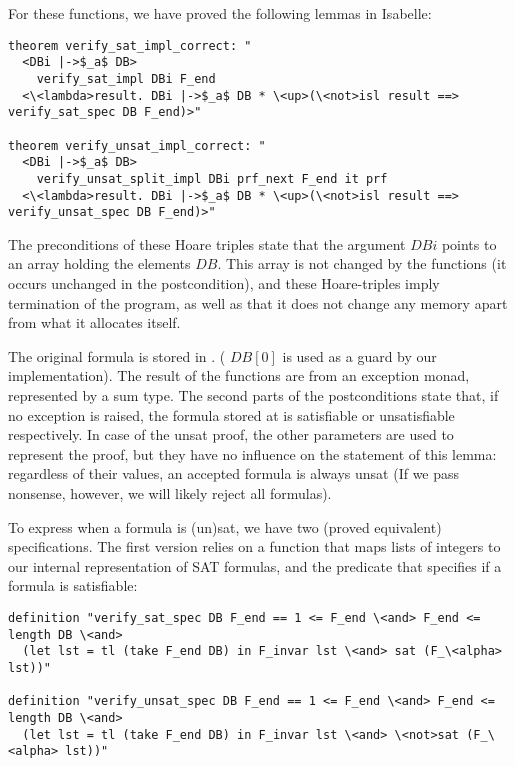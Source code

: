 \documentclass{llncs}     %
\makeatletter
\newcommand{\isai}{\lstinline[language=isabelle,basicstyle=\normalsize\ttfamily\slshape]}
\renewcommand\lstinline[1][]{%
  \leavevmode
  \ifmmode\expandafter\hbox\fi\bgroup
    \def\lst@boxpos{b}%
    \lsthk@PreSet\lstset{flexiblecolumns,#1}%
    \lsthk@TextStyle
    \@ifnextchar\bgroup{\afterassignment\lst@InlineG \let\@let@token}%
                       \lstinline@}
\makeatother
\begin{document}
For these functions, we have proved the following lemmas in Isabelle:

\begin{lstlisting}
theorem verify_sat_impl_correct: "
  <DBi |->$_a$ DB>
    verify_sat_impl DBi F_end
  <\<lambda>result. DBi |->$_a$ DB * \<up>(\<not>isl result ==> verify_sat_spec DB F_end)>"

theorem verify_unsat_impl_correct: "
  <DBi |->$_a$ DB>
    verify_unsat_split_impl DBi prf_next F_end it prf
  <\<lambda>result. DBi |->$_a$ DB * \<up>(\<not>isl result ==> verify_unsat_spec DB F_end)>"
\end{lstlisting}
The preconditions of these Hoare triples state that the argument \isai$DBi$ points to an array
holding the elements \isai$DB$. This array is not changed by the functions (it occurs unchanged in the postcondition),
and these Hoare-triples imply termination of the program, as well as that it does not change any memory apart from what it
allocates itself.

The original formula is stored in \isai{DB[1..<F_end]}. (\isai$DB[0]$ is used as a guard by our implementation).
The result of the functions are from an exception monad, represented by a sum type.
The second parts of the postconditions state that, if no exception is raised, the formula stored at \isai{DB[1..<F_end]} is satisfiable or unsatisfiable respectively. In case of the unsat proof,
the other parameters \isai{prf_next, it, prf} are used to represent the proof, but they have no influence on the statement
of this lemma: regardless of their values, an accepted formula is always unsat (If we pass nonsense, however, we will likely
reject all formulas).

To express when a formula is (un)sat, we have two (proved equivalent) specifications.
The first version relies on a function \isai{F_\<alpha>} that maps lists of integers to our internal
representation of SAT formulas, and the predicate \isai{sat} that specifies if a formula is satisfiable:

\begin{lstlisting}
definition "verify_sat_spec DB F_end == 1 <= F_end \<and> F_end <= length DB \<and>
  (let lst = tl (take F_end DB) in F_invar lst \<and> sat (F_\<alpha> lst))"

definition "verify_unsat_spec DB F_end == 1 <= F_end \<and> F_end <= length DB \<and>
  (let lst = tl (take F_end DB) in F_invar lst \<and> \<not>sat (F_\<alpha> lst))"
\end{lstlisting}
\end{document}
